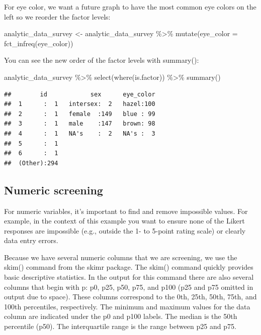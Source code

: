 \documentclass[
]{krantz}
\makeatletter
\newenvironment{Shaded}{\begin{snugshade}}{\end{snugshade}}
\newcommand{\AttributeTok}[1]{\textcolor[rgb]{0.61,0.61,0.61}{#1}}
\newcommand{\FunctionTok}[1]{\textcolor[rgb]{0,0,0}{#1}}
\newcommand{\NormalTok}[1]{#1}
\newcommand{\OtherTok}[1]{\textcolor[rgb]{0.37,0.37,0.37}{#1}}
\newcommand{\SpecialCharTok}[1]{\textcolor[rgb]{0,0,0}{#1}}
\newenvironment{kframe}{%
\medskip{}
\setlength{\fboxsep}{.8em}
 \def\at@end@of@kframe{}%
 \ifinner\ifhmode%
  \def\at@end@of@kframe{\end{minipage}}%
  \begin{minipage}{\columnwidth}%
 \fi\fi%
 \def\FrameCommand##1{\hskip\@totalleftmargin \hskip-\fboxsep
 \colorbox{shadecolor}{##1}\hskip-\fboxsep
     \hskip-\linewidth \hskip-\@totalleftmargin \hskip\columnwidth}%
 \MakeFramed {\advance\hsize-\width
   \@totalleftmargin\z@ \linewidth\hsize
   \@setminipage}}%
 {\par\unskip\endMakeFramed%
 \at@end@of@kframe}
\renewenvironment{Shaded}{\begin{kframe}}{\end{kframe}}
\makeatother
\begin{document}
For eye color, we want a future graph to have the most common eye colors on the left so we reorder the factor levels:

\begin{Shaded}
\begin{Highlighting}[]
\NormalTok{analytic\_data\_survey }\OtherTok{\textless{}{-}}\NormalTok{ analytic\_data\_survey }\SpecialCharTok{\%\textgreater{}\%}
  \FunctionTok{mutate}\NormalTok{(}\AttributeTok{eye\_color =} \FunctionTok{fct\_infreq}\NormalTok{(eye\_color))}
\end{Highlighting}
\end{Shaded}

You can see the new order of the factor levels with summary():

\begin{Shaded}
\begin{Highlighting}[]
\NormalTok{analytic\_data\_survey }\SpecialCharTok{\%\textgreater{}\%}
  \FunctionTok{select}\NormalTok{(}\FunctionTok{where}\NormalTok{(is.factor)) }\SpecialCharTok{\%\textgreater{}\%}
  \FunctionTok{summary}\NormalTok{()}
\end{Highlighting}
\end{Shaded}

\begin{verbatim}
##        id            sex      eye_color  
##  1      :  1   intersex:  2   hazel:100  
##  2      :  1   female  :149   blue : 99  
##  3      :  1   male    :147   brown: 98  
##  4      :  1   NA's    :  2   NA's :  3  
##  5      :  1                             
##  6      :  1                             
##  (Other):294
\end{verbatim}

\hypertarget{numeric-screening}{%
\subsection{Numeric screening}\label{numeric-screening}}

For numeric variables, it's important to find and remove impossible values. For example, in the context of this example you want to ensure none of the Likert responses are impossible (e.g., outside the 1- to 5-point rating scale) or clearly data entry errors.

Because we have several numeric columns that we are screening, we use the skim() command from the skimr package. The skim() command quickly provides basic descriptive statistics. In the output for this command there are also several columns that begin with p: p0, p25, p50, p75, and p100 (p25 and p75 omitted in output due to space). These columns correspond to the 0th, 25th, 50th, 75th, and 100th percentiles, respectively. The minimum and maximum values for the data column are indicated under the p0 and p100 labels. The median is the 50th percentile (p50). The interquartile range is the range between p25 and p75.
\end{document}
